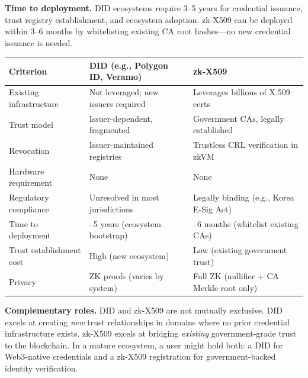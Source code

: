\documentclass[11pt, a4paper]{article}
\begin{document}
\textbf{Time to deployment.} DID ecosystems require 3--5 years for
credential issuance, trust registry establishment, and ecosystem
adoption. zk-X509 can be deployed within 3--6 months by whitelisting
existing CA root hashes---no new credential issuance is needed.

\begin{longtable}[]{@{}
  >{\raggedright\arraybackslash}p{}
  >{\raggedright\arraybackslash}p{}
  >{\raggedright\arraybackslash}p{}@{}}
\toprule\noalign{}
\begin{minipage}[b]{\linewidth}\raggedright
Criterion
\end{minipage} & \begin{minipage}[b]{\linewidth}\raggedright
DID (e.g., Polygon ID, Veramo)
\end{minipage} & \begin{minipage}[b]{\linewidth}\raggedright
zk-X509
\end{minipage} \\
\midrule\noalign{}
\endhead
\bottomrule\noalign{}
\endlastfoot
Existing infrastructure & Not leveraged; new issuers required &
Leverages billions of X.509 certs \\
Trust model & Issuer-dependent, fragmented & Government CAs, legally
established \\
Revocation & Issuer-maintained registries & Trustless CRL verification
in zkVM \\
Hardware requirement & None & None \\
Regulatory compliance & Unresolved in most jurisdictions & Legally
binding (e.g., Korea E-Sig Act) \\
Time to deployment & 3--5 years (ecosystem bootstrap) & 3--6 months
(whitelist existing CAs) \\
Trust establishment cost & High (new ecosystem) & Low (existing
government trust) \\
Privacy & ZK proofs (varies by system) & Full ZK (nullifier + CA Merkle
root only) \\
\end{longtable}

\textbf{Complementary roles.} DID and zk-X509 are not mutually
exclusive. DID excels at creating \emph{new} trust relationships in
domains where no prior credential infrastructure exists. zk-X509 excels
at bridging \emph{existing} government-grade trust to the blockchain. In
a mature ecosystem, a user might hold both: a DID for Web3-native
credentials and a zk-X509 registration for government-backed identity
verification.
\end{document}
